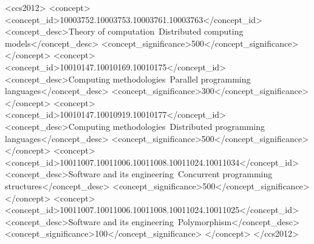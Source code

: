 \documentclass[sigplan,screen]{acmart}
\begin{document}
\begin{CCSXML}
<ccs2012>
   <concept>
       <concept_id>10003752.10003753.10003761.10003763</concept_id>
       <concept_desc>Theory of computation~Distributed computing models</concept_desc>
       <concept_significance>500</concept_significance>
       </concept>
   <concept>
       <concept_id>10010147.10010169.10010175</concept_id>
       <concept_desc>Computing methodologies~Parallel programming languages</concept_desc>
       <concept_significance>300</concept_significance>
       </concept>
   <concept>
       <concept_id>10010147.10010919.10010177</concept_id>
       <concept_desc>Computing methodologies~Distributed programming languages</concept_desc>
       <concept_significance>500</concept_significance>
       </concept>
   <concept>
       <concept_id>10011007.10011006.10011008.10011024.10011034</concept_id>
       <concept_desc>Software and its engineering~Concurrent programming structures</concept_desc>
       <concept_significance>500</concept_significance>
       </concept>
   <concept>
       <concept_id>10011007.10011006.10011008.10011024.10011025</concept_id>
       <concept_desc>Software and its engineering~Polymorphism</concept_desc>
       <concept_significance>100</concept_significance>
       </concept>
 </ccs2012>
\end{CCSXML}




\maketitle
\end{document}
